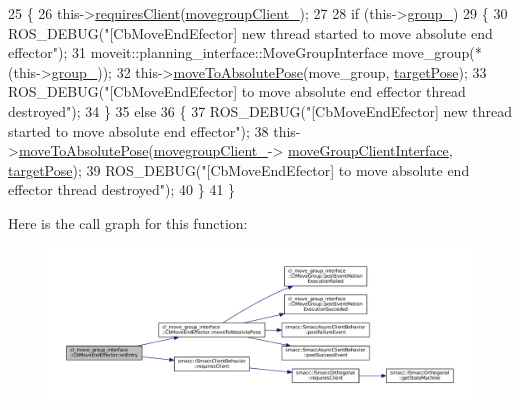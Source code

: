 \begin{DoxyCode}
25 \{
26   this->\hyperlink{classsmacc_1_1ISmaccClientBehavior_a32b16e99e3b4cb289414203dc861a440}{requiresClient}(\hyperlink{classcl__move__group__interface_1_1CbMoveEndEffector_a86583cb37788b461fc8bb38102a8c0ed}{movegroupClient\_});
27 
28   \textcolor{keywordflow}{if} (this->\hyperlink{classcl__move__group__interface_1_1CbMoveEndEffector_a3060dbea1460d4d55ca73b95f4d17575}{group\_})
29   \{
30       ROS\_DEBUG(\textcolor{stringliteral}{"[CbMoveEndEfector] new thread started to move absolute end effector"});
31       moveit::planning\_interface::MoveGroupInterface move\_group(*(this->\hyperlink{classcl__move__group__interface_1_1CbMoveEndEffector_a3060dbea1460d4d55ca73b95f4d17575}{group\_}));
32       this->\hyperlink{classcl__move__group__interface_1_1CbMoveEndEffector_a533ec599a0e248f3cb024e9cdf148db2}{moveToAbsolutePose}(move\_group, \hyperlink{classcl__move__group__interface_1_1CbMoveEndEffector_ab0d0c060e52c6f09a6af727e6e954064}{targetPose});
33       ROS\_DEBUG(\textcolor{stringliteral}{"[CbMoveEndEfector] to move absolute end effector thread destroyed"});
34   \}
35   \textcolor{keywordflow}{else}
36   \{
37       ROS\_DEBUG(\textcolor{stringliteral}{"[CbMoveEndEfector] new thread started to move absolute end effector"});
38       this->\hyperlink{classcl__move__group__interface_1_1CbMoveEndEffector_a533ec599a0e248f3cb024e9cdf148db2}{moveToAbsolutePose}(\hyperlink{classcl__move__group__interface_1_1CbMoveEndEffector_a86583cb37788b461fc8bb38102a8c0ed}{movegroupClient\_}->
      \hyperlink{classcl__move__group__interface_1_1ClMoveGroup_a92922ea689e4e1b7b91512c56629c95b}{moveGroupClientInterface}, \hyperlink{classcl__move__group__interface_1_1CbMoveEndEffector_ab0d0c060e52c6f09a6af727e6e954064}{targetPose});
39       ROS\_DEBUG(\textcolor{stringliteral}{"[CbMoveEndEfector] to move absolute end effector thread destroyed"});
40   \}
41 \}
\end{DoxyCode}
Here is the call graph for this function\+:
\nopagebreak
\begin{figure}[H]
\begin{center}
\leavevmode
\includegraphics[width=350pt]{classcl__move__group__interface_1_1CbMoveEndEffector_a7e7c22ac6c5725bc95e9852c3f6d939d_cgraph}
\end{center}
\end{figure}



